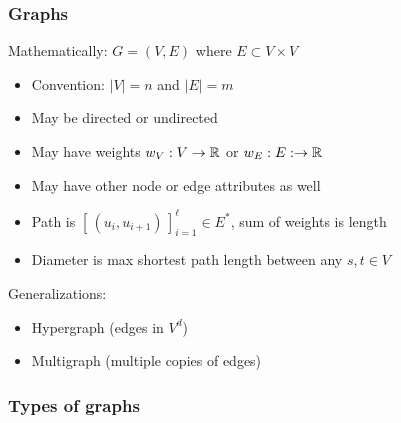 \documentclass{beamer}
\begin{document}
\begin{frame}
  \titlepage
\end{frame}


\begin{frame}
  \frametitle{Graphs}

  Mathematically: $G = (V,E)$ where $E \subset V \times V$
  \begin{itemize}
  \item Convention: $|V| = n$ and $|E| = m$
  \item May be directed or undirected
  \item May have weights $w_V : V \rightarrow \mathbb{R}$ or
    $w_E : E : \rightarrow \mathbb{R}$
  \item May have other node or edge attributes as well
  \item Path is $\left[ \, (u_i,u_{i+1}) \, \right]_{i=1}^\ell \in E^*$,
    sum of weights is length
  \item Diameter is max shortest path length between any $s, t \in V$
  \end{itemize}
  Generalizations:
  \begin{itemize}
  \item Hypergraph (edges in $V^d$)
  \item Multigraph (multiple copies of edges)
  \end{itemize}
\end{frame}

\begin{frame}
  \frametitle{Types of graphs}

  \begin{center}
  \end{center}
\end{frame}
\end{document}
